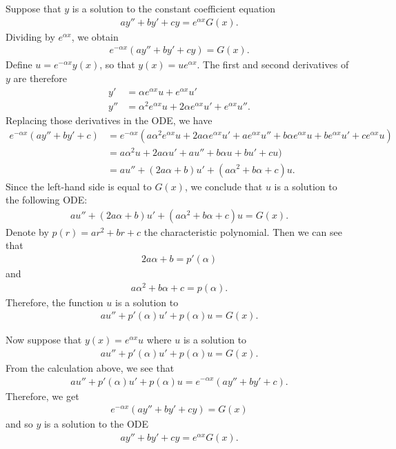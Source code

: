\documentclass[12pt]{article}
\newcommand{\op}{\left(}
\newcommand{\fp}{\right)}
\newcommand{\exo}[3]{\noindent\textcolor{red}{\fbox{\textbf{Section {#1} | Problem {#2} | {#3} points}}}\\}
\begin{document}
	\exo{5.4}{30(a)}{5}
	\\
	Suppose that $y$ is a solution to the constant coefficient equation
		\begin{align*}
		ay'' + by' + cy = e^{\alpha x} G(x) .
		\end{align*}
	Dividing by $e^{\alpha x}$, we obtain
		\begin{align*}
		e^{-\alpha x} (ay'' + by' + cy) = G(x) .
		\end{align*}
	Define $u = e^{-\alpha x} y (x)$, so that $y(x) = ue^{\alpha x}$. The first and second derivatives of $y$ are therefore
		\begin{align*}
		y' &= \alpha e^{\alpha x} u + e^{\alpha x} u' \\
		y'' &= \alpha^2 e^{\alpha x} u + 2\alpha e^{\alpha x} u' + e^{\alpha x} u'' .
		\end{align*}
	Replacing those derivatives in the ODE, we have
		\begin{align*}
		e^{-\alpha x} (ay'' + by' + c ) &= e^{-\alpha x} \op a \alpha^2 e^{\alpha x} u + 2 a \alpha e^{\alpha x} u' + ae^{\alpha x} u'' + b \alpha e^{\alpha x} u + be^{\alpha x} u' + ce^{\alpha x} u \fp \\
		&= a \alpha^2 u + 2a \alpha u' + a u'' + b\alpha u + bu' + cu) \\
		&= a u'' + (2a\alpha + b)u' + (a \alpha^2 + b \alpha + c ) u .
		\end{align*}
	Since the left-hand side is equal to $G(x)$, we conclude that $u$ is a solution to the following ODE:
		\begin{align*}
		a u'' + (2a\alpha + b)u' + (a \alpha^2 + b \alpha + c ) u = G(x) .
		\end{align*}
	Denote by $p(r) = ar^2 + br + c$ the characteristic polynomial. Then we can see that
		\begin{align*}
		2a \alpha + b = p'(\alpha )
		\end{align*}
	and
		\begin{align*}
		a\alpha^2 + b\alpha + c = p(\alpha ) .
		\end{align*}
	Therefore, the function $u$ is a solution to
		\begin{align*}
		au'' + p'(\alpha ) u' + p(\alpha ) u = G(x) .
		\end{align*}
		
	Now suppose that $y (x) = e^{\alpha x} u$ where $u$ is a solution to 
		\begin{align*}
		a u'' + p'(\alpha ) u' + p (\alpha ) u = G(x) .
		\end{align*}
	From the calculation above, we see that
		\begin{align*}
		a u'' + p'(\alpha ) u' + p (\alpha ) u = e^{-\alpha x} (a y'' + by' + c) .
		\end{align*}
	Therefore, we get
		\begin{align*}
		e^{-\alpha x} (ay'' + by' + cy) = G(x)
		\end{align*}
	and so $y$ is a solution to the ODE
		\begin{align*}
		ay'' + by' + cy = e^{\alpha x} G(x) .
		\end{align*}
	\newpage
	
\end{document}
